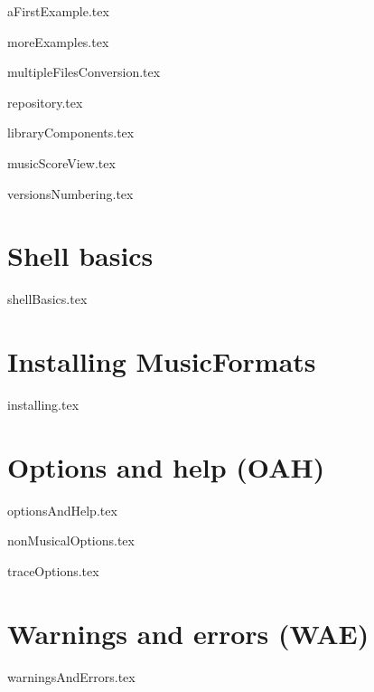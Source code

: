 \documentclass[11pt,a4paper]{report}
\begin{document}
{aFirstExample.tex}

{moreExamples.tex}

{multipleFilesConversion.tex}

{repository.tex}

{libraryComponents.tex}

{musicScoreView.tex}

{versionsNumbering.tex}


\part{Shell basics}

{shellBasics.tex}


\part{Installing MusicFormats}

{installing.tex}


\part{Options and help (OAH)}

{optionsAndHelp.tex}

{nonMusicalOptions.tex}

{traceOptions.tex}



\part{Warnings and errors (WAE)}

{warningsAndErrors.tex}
\end{document}
